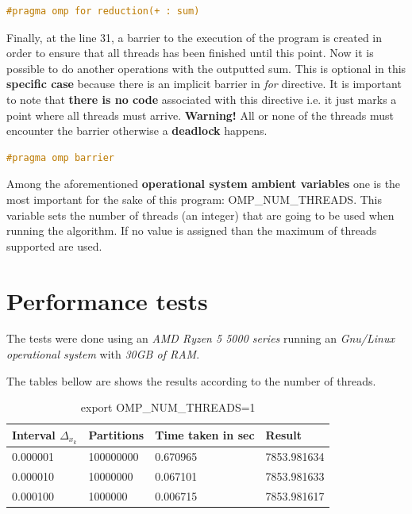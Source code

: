 		\begin{lstlisting}[language=C++]
#pragma omp for reduction(+ : sum)
		\end{lstlisting}
	
		\par Finally, at the line 31, a barrier to the execution of the program is created in order to ensure that all threads has been finished until this point. Now it is possible to do another operations with the outputted sum.  This is optional in this \textbf{specific case} because there is an implicit barrier in \textit{for} directive. It is important to note that \textbf{there is no code} associated with this directive i.e. it just marks a point where all threads must arrive. \textbf{Warning!} All or none of the threads must encounter the barrier otherwise a \textbf{deadlock} happens.
		
		\begin{lstlisting}[language=C++]
#pragma omp barrier
		\end{lstlisting}
	
		\par Among the aforementioned \textbf{operational system ambient variables} one is the most important for the sake of this program: OMP\_NUM\_THREADS. This variable sets the number of threads (an integer) that are going to be used when running the algorithm. If no value is assigned than the maximum of threads supported are used.

	\section{Performance tests}
		\par The tests were done using an \textit{AMD Ryzen 5 5000 series} running an \textit{Gnu/Linux operational system} with \textit{30GB of RAM}.\newline
		
		\par The tables bellow are shows the results according to the number of threads. 
		
		\begin{table}[h]
			\caption{export OMP\_NUM\_THREADS=1}
			\begin{center}
				\begin{tabular}{|l|l|l|l|}
					\hline
					Interval $\Delta_{x_k}$  &  Partitions  &  Time taken in sec &  Result \\
					\hline
					0.000001  &  100000000  &  0.670965  &  7853.981634 \\
					\hline
					0.000010  &  10000000  &  0.067101  &  7853.981633 \\
					\hline
					0.000100  &  1000000  &  0.006715  &  7853.981617 \\
					\hline
				\end{tabular}
			\end{center}
		\end{table}
		
